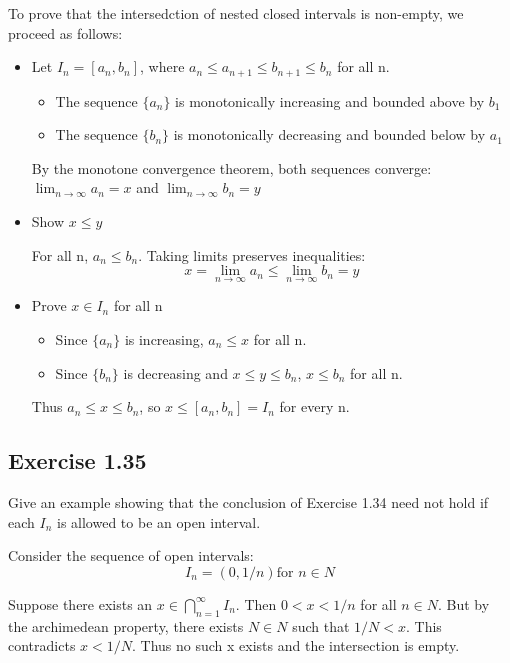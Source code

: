 \documentclass[12pt]{article}
\begin{document}
			To prove that the intersedction of nested closed intervals is non-empty, we proceed as follows:
			\begin{itemize}
				\item Let $I_n = [a_n, b_n]$, where $a_n \le a_{n+1} \le b_{n+1} \le b_n$ for all n.
				\begin{itemize}
					\item The sequence $\{a_n\}$ is monotonically increasing and bounded above by $b_1$
					\item The sequence $\{b_n\}$ is monotonically decreasing and bounded below by $a_1$
				\end{itemize}
				By the monotone convergence theorem, both sequences converge: $\lim_{n \rightarrow \infty}a_n = x$ and $\lim_{n \rightarrow \infty}b_n = y$
				
				\item Show $x \le y$
				
				For all n, $a_n \le b_n$. Taking limits preserves inequalities:
				\begin{equation}
					x = \lim_{n \rightarrow \infty}a_n \le \lim_{n \rightarrow \infty}b_n = y
				\end{equation}
				
				\item Prove $x \in I_n$ for all n
					\begin{itemize}
						\item Since $\{a_n\}$ is increasing, $a_n \le x$ for all n.
						\item Since $\{b_n\}$ is decreasing and $x \le y \le b_n$, $x \le b_n$ for all n.
					\end{itemize}
					Thus $a_n \le x \le b_n$, so $x \le [a_n, b_n] = I_n$ for every n.
			\end{itemize}
		\subsection*{Exercise 1.35}
			Give an example showing that the conclusion of Exercise 1.34 need not hold if each $I_n$ is allowed to be an open interval.
			
			Consider the sequence of open intervals:
			\begin{equation}
				I_n = (0, 1/n) \text{for $n \in N$}
			\end{equation}
			
			Suppose there exists an $x \in \bigcap_{n=1}^{\infty}I_n$. Then $0 < x < 1/n$ for all $n \in N$. But by the archimedean property, there exists $N \in N$ such that $1/N < x$. This contradicts $x < 1/N$. Thus no such x exists and the intersection is empty.
\end{document}
